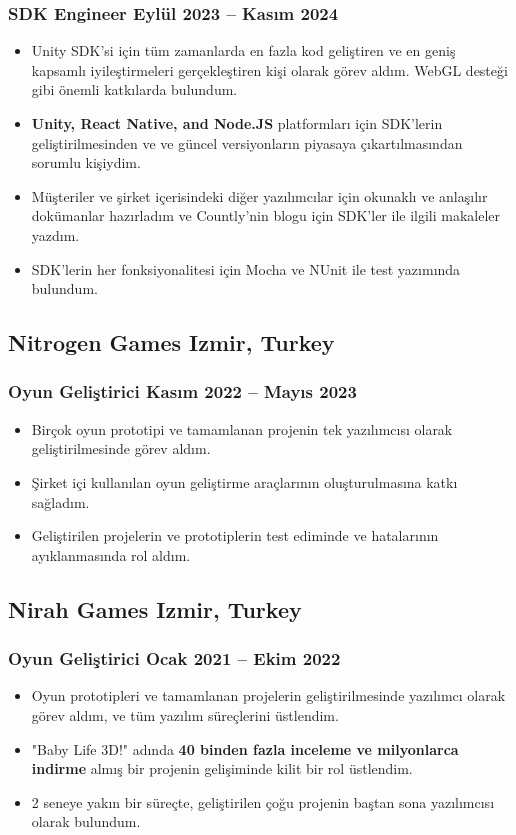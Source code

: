\documentclass[11pt]{article}
\newcommand{\rside}[1]{
  \hfill {\normalfont\color{accent} #1}%
}
\begin{document}
\subsubsection{SDK Engineer \rside{Eylül 2023 -- Kasım 2024}}
\begin{itemize}
  \item Unity SDK'si için tüm zamanlarda en fazla kod geliştiren ve en geniş kapsamlı iyileştirmeleri gerçekleştiren kişi olarak görev aldım. WebGL desteği gibi önemli katkılarda bulundum.
  \item \textbf{Unity, React Native, and Node.JS} platformları için SDK'lerin geliştirilmesinden ve ve güncel versiyonların piyasaya çıkartılmasından sorumlu kişiydim.
  \item Müşteriler ve şirket içerisindeki diğer yazılımcılar için okunaklı ve anlaşılır dokümanlar hazırladım ve Countly'nin blogu için SDK'ler ile ilgili makaleler yazdım.
  \item SDK'lerin her fonksiyonalitesi için Mocha ve NUnit ile test yazımında bulundum.
\end{itemize}

\subsection{Nitrogen Games \rside{Izmir, Turkey}}
\subsubsection{Oyun Geliştirici \rside{Kasım 2022 -- Mayıs 2023}}
\begin{itemize}
  \item Birçok oyun prototipi ve tamamlanan projenin tek yazılımcısı olarak geliştirilmesinde görev aldım.
  \item Şirket içi kullanılan oyun geliştirme araçlarının oluşturulmasına katkı sağladım.
  \item Geliştirilen projelerin ve prototiplerin test ediminde ve hatalarının ayıklanmasında rol aldım.
\end{itemize}

\subsection{Nirah Games  \rside{Izmir, Turkey}}
\subsubsection{Oyun Geliştirici \rside{Ocak 2021 -- Ekim 2022}}
\begin{itemize}
  \item Oyun prototipleri ve tamamlanan projelerin geliştirilmesinde yazılımcı olarak görev aldım, ve tüm yazılım süreçlerini üstlendim.
  \item "Baby Life 3D!" adında \textbf{40 binden fazla inceleme ve milyonlarca indirme} almış bir projenin gelişiminde kilit bir rol üstlendim.
  \item 2 seneye yakın bir süreçte, geliştirilen çoğu projenin baştan sona yazılımcısı olarak bulundum.
\end{itemize}
\end{document}
